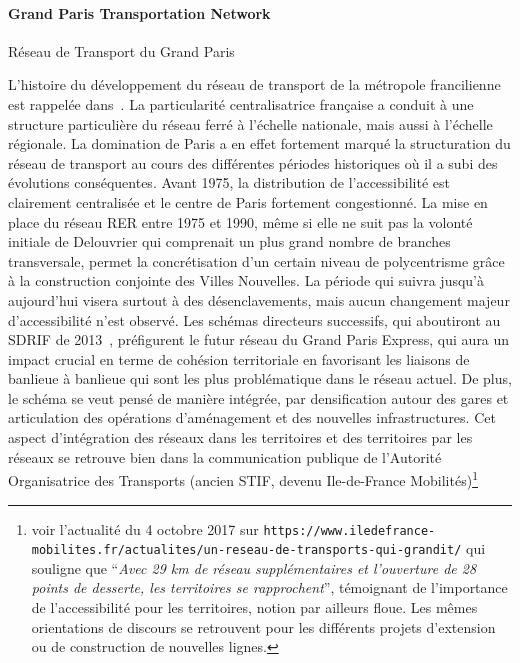 \paragraph{Grand Paris Transportation Network}{Réseau de Transport du Grand Paris}

L'histoire du développement du réseau de transport de la métropole francilienne est rappelée dans~\cite{beauguitte:halshs-01068589}. La particularité centralisatrice française a conduit à une structure particulière du réseau ferré à l'échelle nationale, mais aussi à l'échelle régionale. La domination de Paris a en effet fortement marqué la structuration du réseau de transport au cours des différentes périodes historiques où il a subi des évolutions conséquentes. Avant 1975, la distribution de l'accessibilité est clairement centralisée et le centre de Paris fortement congestionné. La mise en place du réseau RER entre 1975 et 1990, même si elle ne suit pas la volonté initiale de Delouvrier qui comprenait un plus grand nombre de branches transversale, permet la concrétisation d'un certain niveau de polycentrisme grâce à la construction conjointe des Villes Nouvelles. La période qui suivra jusqu'à aujourd'hui visera surtout à des désenclavements, mais aucun changement majeur d'accessibilité n'est observé. Les schémas directeurs successifs, qui aboutiront au SDRIF de 2013~\cite{sdrif2013}, préfigurent le futur réseau du Grand Paris Express, qui aura un impact crucial en terme de cohésion territoriale en favorisant les liaisons de banlieue à banlieue qui sont les plus problématique dans le réseau actuel. De plus, le schéma se veut pensé  de manière intégrée, par densification autour des gares et articulation des opérations d'aménagement et des nouvelles infrastructures. Cet aspect d'intégration des réseaux dans les territoires et des territoires par les réseaux se retrouve bien dans la communication publique de l'Autorité Organisatrice des Transports (ancien STIF, devenu Ile-de-France Mobilités)\footnote{voir l'actualité du 4 octobre 2017 sur \texttt{https://www.iledefrance-mobilites.fr/actualites/un-reseau-de-transports-qui-grandit/} qui souligne que ``\textit{Avec 29 km de réseau supplémentaires et l’ouverture de 28 points de desserte, les territoires se rapprochent}'', témoignant de l'importance de l'accessibilité pour les territoires, notion par ailleurs floue. Les mêmes orientations de discours se retrouvent pour les différents projets d'extension ou de construction de nouvelles lignes.}




